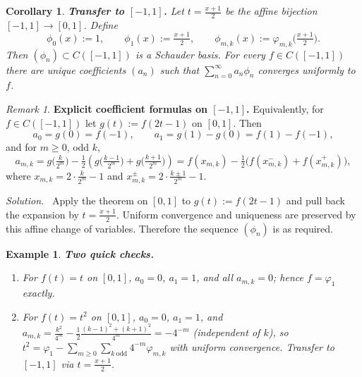 \documentclass[11pt,a4paper]{article}
\newtheorem{example}{Example}
\newtheorem{corollary}[theorem]{Corollary}
\theoremstyle{definition}
\theoremstyle{definition}
\theoremstyle{plain}
\theoremstyle{remark}
\newtheorem{remark}[exercise]{Remark}
\newenvironment{solution}{\par\noindent\textit{Solution.}\ }{\par\vspace{0.5em}}
\begin{document}
\begin{corollary}
	\textbf{Transfer to $[-1,1]$.}
	Let $t=\tfrac{x+1}{2}$ be the affine bijection $[-1,1]\to[0,1]$. Define
	\[
	\phi_0(x):=1,\qquad \phi_1(x):=\tfrac{x+1}{2},\qquad
	\phi_{m,k}(x):=\varphi_{m,k}\!\Big(\tfrac{x+1}{2}\Big).
	\]
	Then $(\phi_n)\subset C([-1,1])$ is a Schauder basis. For every $f\in C([-1,1])$
	there are unique coefficients $(a_n)$ such that
	$\sum_{n=0}^\infty a_n\phi_n$ converges uniformly to $f$.
\end{corollary}

\begin{remark}
	\textbf{Explicit coefficient formulas on $[-1,1]$.}
	Equivalently, for $f\in C([-1,1])$ let $g(t):=f(2t-1)$ on $[0,1]$. Then
	\[
	a_0=g(0)=f(-1),\qquad a_1=g(1)-g(0)=f(1)-f(-1),
	\]
	and for $m\ge0$, odd $k$,
	\[
	a_{m,k}=g\!\Big(\tfrac{k}{2^m}\Big)-\tfrac12\!\left(g\!\Big(\tfrac{k-1}{2^m}\Big)+
	g\!\Big(\tfrac{k+1}{2^m}\Big)\right)
	= f(x_{m,k})-\tfrac12\big(f(x_{m,k}^{-})+f(x_{m,k}^{+})\big),
	\]
	where $x_{m,k}=2\cdot \tfrac{k}{2^m}-1$ and $x_{m,k}^{\pm}=2\cdot \tfrac{k\pm1}{2^m}-1$.
\end{remark}

\begin{solution}
	Apply the theorem on $[0,1]$ to $g(t):=f(2t-1)$ and pull back the expansion by $t=\tfrac{x+1}{2}$.
	Uniform convergence and uniqueness are preserved by this affine change of variables. Therefore
	the sequence $(\phi_n)$ is as required.
\end{solution}

\begin{example}
	\textbf{Two quick checks.}
	\hfill
	\begin{enumerate}[leftmargin=2em]
		\item For $f(t)=t$ on $[0,1]$, $a_0=0$, $a_1=1$, and all $a_{m,k}=0$; hence $f=\varphi_1$ exactly.
		\item For $f(t)=t^2$ on $[0,1]$, $a_0=0$, $a_1=1$, and
		\(
		a_{m,k}=\frac{k^2}{4^m}-\tfrac12\frac{(k-1)^2+(k+1)^2}{4^m}=-4^{-m}
		\)
		(independent of $k$), so
		\(
		t^2=\varphi_1-\sum_{m\ge0}\sum_{k\ \mathrm{odd}}4^{-m}\varphi_{m,k}
		\)
		with uniform convergence. Transfer to $[-1,1]$ via $t=\tfrac{x+1}{2}$.
	\end{enumerate}
\end{example}
\end{document}

